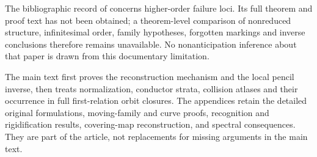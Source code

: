 The bibliographic record of \cite{Ballico93} concerns higher-order
failure loci. Its full theorem and proof text has not been obtained;
a theorem-level comparison of nonreduced structure, infinitesimal
order, family hypotheses, forgotten markings and inverse conclusions
therefore remains unavailable. No nonanticipation inference about that
paper is drawn from this documentary limitation.

The main text first proves the reconstruction mechanism and the local
pencil inverse, then treats normalization, conductor strata, collision
atlases and their occurrence in full first-relation orbit closures.
The appendices retain the detailed original formulations, moving-family
and curve proofs, recognition and rigidification results, covering-map
reconstruction, and spectral consequences. They are part of the article,
not replacements for missing arguments in the main text.

